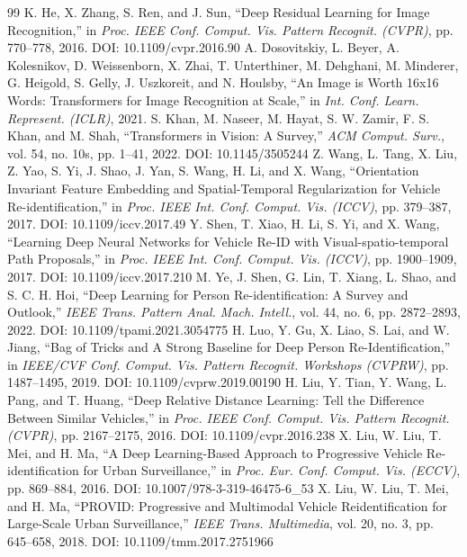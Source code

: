 \documentclass{ijitcs}
\newcommand{\crx}[1]{{\color{red}#1}}
\begin{document}
\begin{thebibliography}{99}
\addtolength{\itemsep}{-.6em}
 K. He, X. Zhang, S. Ren, and J. Sun, ``Deep Residual Learning for Image Recognition,'' in \emph{Proc. IEEE Conf. Comput. Vis. Pattern Recognit. (CVPR)}, pp. 770--778, 2016. \crx{DOI: 10.1109/cvpr.2016.90}
 A. Dosovitskiy, L. Beyer, A. Kolesnikov, D. Weissenborn, X. Zhai, T. Unterthiner, M. Dehghani, M. Minderer, G. Heigold, S. Gelly, J. Uszkoreit, and N. Houlsby, ``An Image is Worth 16x16 Words: Transformers for Image Recognition at Scale,'' in \emph{Int. Conf. Learn. Represent. (ICLR)}, 2021.
 S. Khan, M. Naseer, M. Hayat, S. W. Zamir, F. S. Khan, and M. Shah, ``Transformers in Vision: A Survey,'' \emph{ACM Comput. Surv.}, vol. 54, no. 10s, pp. 1--41, 2022. \crx{DOI: 10.1145/3505244}
 Z. Wang, L. Tang, X. Liu, Z. Yao, S. Yi, J. Shao, J. Yan, S. Wang, H. Li, and X. Wang, ``Orientation Invariant Feature Embedding and Spatial-Temporal Regularization for Vehicle Re-identification,'' in \emph{Proc. IEEE Int. Conf. Comput. Vis. (ICCV)}, pp. 379--387, 2017. \crx{DOI: 10.1109/iccv.2017.49}
 Y. Shen, T. Xiao, H. Li, S. Yi, and X. Wang, ``Learning Deep Neural Networks for Vehicle Re-ID with Visual-spatio-temporal Path Proposals,'' in \emph{Proc. IEEE Int. Conf. Comput. Vis. (ICCV)}, pp. 1900--1909, 2017. \crx{DOI: 10.1109/iccv.2017.210}
 M. Ye, J. Shen, G. Lin, T. Xiang, L. Shao, and S. C. H. Hoi, ``Deep Learning for Person Re-identification: A Survey and Outlook,'' \emph{IEEE Trans. Pattern Anal. Mach. Intell.}, vol. 44, no. 6, pp. 2872--2893, 2022. \crx{DOI: 10.1109/tpami.2021.3054775}
 H. Luo, Y. Gu, X. Liao, S. Lai, and W. Jiang, ``Bag of Tricks and A Strong Baseline for Deep Person Re-Identification,'' in \emph{IEEE/CVF Conf. Comput. Vis. Pattern Recognit. Workshops (CVPRW)}, pp. 1487--1495, 2019. \crx{DOI: 10.1109/cvprw.2019.00190}
 H. Liu, Y. Tian, Y. Wang, L. Pang, and T. Huang, ``Deep Relative Distance Learning: Tell the Difference Between Similar Vehicles,'' in \emph{Proc. IEEE Conf. Comput. Vis. Pattern Recognit. (CVPR)}, pp. 2167--2175, 2016. \crx{DOI: 10.1109/cvpr.2016.238}
 X. Liu, W. Liu, T. Mei, and H. Ma, ``A Deep Learning-Based Approach to Progressive Vehicle Re-identification for Urban Surveillance,'' in \emph{Proc. Eur. Conf. Comput. Vis. (ECCV)}, pp. 869--884, 2016. \crx{DOI: 10.1007/978-3-319-46475-6\_53}
 X. Liu, W. Liu, T. Mei, and H. Ma, ``PROVID: Progressive and Multimodal Vehicle Reidentification for Large-Scale Urban Surveillance,'' \emph{IEEE Trans. Multimedia}, vol. 20, no. 3, pp. 645--658, 2018. \crx{DOI: 10.1109/tmm.2017.2751966}

\end{thebibliography}
\end{document}
